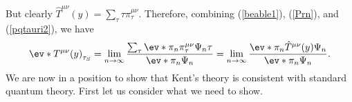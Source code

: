 \documentclass[12pt]{report}
\begin{document}
But clearly $\hat{T}^{\mu\nu}(y)=\sum_\tau \tau \pi_\tau^{\mu\nu}.$ Therefore, combining (\ref{beable1}), (\ref{Prn}), and (\ref{pqtauri2}), we have 
\begin{equation}\label{kentconsistency0}
\ev*{T^{\mu\nu}(y)}_{\tau_S}=\lim_{n\rightarrow\infty}\frac{\sum_\tau \ev*{\pi_n\pi_\tau^{\mu\nu}}{\Psi_n}\tau}{\ev*{\pi_n}{\Psi_n}}=\lim_{n\rightarrow\infty}\frac{\ev*{\pi_n\hat{T}^{\mu\nu}(y)}{\Psi_n}}{\ev*{\pi_n}{\Psi_n}}.
\end{equation}We are now in a position to show that Kent's theory is consistent with standard quantum theory. First let us consider what we need to show. 
\end{document}
